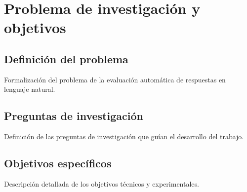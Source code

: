 \chapter{Problema de investigación y objetivos}

\section{Definición del problema}
Formalización del problema de la evaluación automática de respuestas en lenguaje natural.

\section{Preguntas de investigación}
Definición de las preguntas de investigación que guían el desarrollo del trabajo.

\section{Objetivos específicos}
Descripción detallada de los objetivos técnicos y experimentales.
